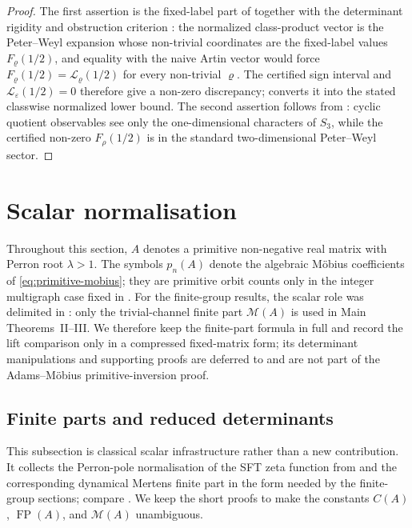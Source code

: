 \documentclass[11pt,a4paper]{amsart}
\theoremstyle{plain}
\theoremstyle{definition}
\theoremstyle{remark}
\DeclareMathOperator{\FP}{FP}
\begin{document}
\begin{proof}
  The first assertion is the fixed-label part of
   together with the determinant
  rigidity and obstruction criterion
  :
  the normalized class-product vector is the Peter--Weyl expansion whose
  non-trivial coordinates are the fixed-label values
  \(F_\varrho(1/2)\), and equality with the naive Artin vector would force
  \(F_\varrho(1/2)=\mathcal L_\varrho(1/2)\) for every non-trivial
  \(\varrho\).  The certified sign interval and
  \(\mathcal L_\varepsilon(1/2)=0\) therefore give a non-zero discrepancy;
   converts it into the stated classwise
  normalized lower bound.  The second assertion follows from
  : cyclic
  quotient observables see only the one-dimensional characters of
  \(S_3\), while the certified non-zero \(F_\rho(1/2)\) is in the standard
  two-dimensional Peter--Weyl sector.
\end{proof}
\section{Scalar normalisation}
\label{sec:finite-part}

Throughout this section, \(A\) denotes a primitive non-negative real
matrix with Perron root \(\lambda>1\). The symbols \(p_n(A)\) denote the
algebraic M\"obius coefficients of \eqref{eq:primitive-mobius}; they are
primitive orbit counts only in the integer multigraph case fixed in
. For the finite-group results, the scalar role
was delimited in : only the
trivial-channel finite part \(\mathcal M(A)\) is used in Main
Theorems~II--III. We therefore keep the finite-part formula in full and
record the lift comparison only in a compressed fixed-matrix form; its
determinant manipulations and supporting proofs are deferred to
 and are not part of the
Adams--M\"obius primitive-inversion proof.

\subsection{Finite parts and reduced determinants}

This subsection is classical scalar infrastructure rather than a new
contribution.  It collects the Perron-pole normalisation of the SFT zeta
function from  and the corresponding
dynamical Mertens finite part in the form needed by the finite-group
sections; compare \cite{BowenLanford1970Zeta,Parry1983PrimeOrbit,Sharp1991Mertens,LindMarcus1995,ParryPollicott1990Zeta}.  We keep the
short proofs to make the constants \(C(A)\), \(\FP(A)\), and
\(\mathcal M(A)\) unambiguous.
\end{document}
